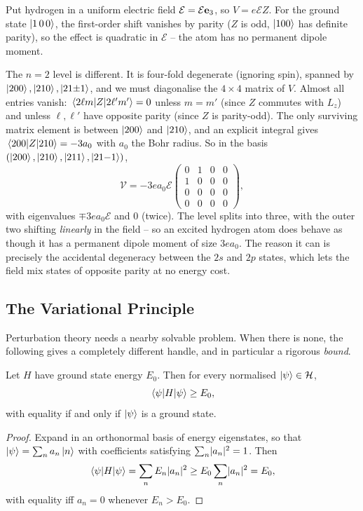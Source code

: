 \documentclass[a4paper]{scrartcl}
\begin{document}
\begin{example}
    Put hydrogen in a uniform electric field $\mathbf{\mathcal{E}} = \mathcal{E}\mathbf{e}_3$, so $V = e\mathcal{E}Z$. For the ground state $\ket{1\,0\,0}$, the first-order shift vanishes by parity ($Z$ is odd, $\ket{100}$ has definite parity), so the effect is quadratic in $\mathcal{E}$ -- the atom has no permanent dipole moment.

    The $n=2$ level is different. It is four-fold degenerate (ignoring spin), spanned by $\ket{200}, \ket{210},\ket{21{\pm}1}$, and we must diagonalise the $4\times4$ matrix of $V$. Almost all entries vanish: $\mel{2\ell m}{Z}{2\ell'm'} = 0$ unless $m = m'$ (since $Z$ commutes with $L_z$) and unless $\ell,\ell'$ have opposite parity (since $Z$ is parity-odd). The only surviving matrix element is between $\ket{200}$ and $\ket{210}$, and an explicit integral gives $\mel{200}{Z}{210} = -3a_0$ with $a_0$ the Bohr radius. So in the basis $(\ket{200},\ket{210},\ket{211},\ket{21{-}1})$,
    $$
    \mathcal{V} = -3ea_0\mathcal{E}\begin{pmatrix}0&1&0&0\\1&0&0&0\\0&0&0&0\\0&0&0&0\end{pmatrix},
    $$
    with eigenvalues $\mp3ea_0\mathcal{E}$ and $0$ (twice). The level splits into three, with the outer two shifting \emph{linearly} in the field -- so an excited hydrogen atom does behave as though it has a permanent dipole moment of size $3ea_0$. The reason it can is precisely the accidental degeneracy between the $2s$ and $2p$ states, which lets the field mix states of opposite parity at no energy cost.
\end{example}

\subsection{The Variational Principle}

Perturbation theory needs a nearby solvable problem. When there is none, the following gives a completely different handle, and in particular a rigorous \emph{bound}.

\begin{theorem}
    Let $H$ have ground state energy $E_0$. Then for every normalised $\ket\psi \in \mathcal{H}$,
    $$
    \mel{\psi}{H}{\psi} \geq E_0,
    $$
    with equality if and only if $\ket\psi$ is a ground state.
\end{theorem}
\begin{proof}
    Expand in an orthonormal basis of energy eigenstates, so that $\ket\psi = \sum_n a_n \ket n$ with coefficients satisfying $\sum_n \lvert a_n\rvert^2 = 1$. Then
    $$
    \mel{\psi}{H}{\psi} = \sum_n E_n \lvert a_n\rvert^2 \geq E_0 \sum_n \lvert a_n\rvert^2 = E_0,
    $$
    with equality iff $a_n = 0$ whenever $E_n > E_0$.
\end{proof}
\end{document}
